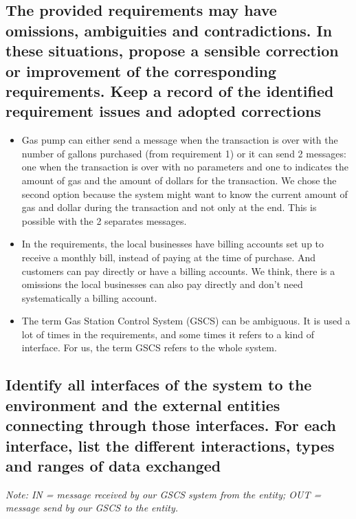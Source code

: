 \documentclass[11pt,a4paper]{article}
\begin{document}
\subsection*{The provided requirements may have omissions, ambiguities and contradictions. In these situations, propose a sensible correction or improvement of the corresponding requirements. Keep a record of the identified requirement issues and adopted corrections}
\begin{itemize}
	\item Gas pump can either send a message when the transaction is over with the number of gallons purchased (from requirement 1) or it can send 2 messages: one when the transaction is over with no parameters and one to indicates the amount of gas and the amount of dollars for the transaction.
We chose the second option because the system might want to know the current amount of gas and dollar during the transaction and not only at the end. This is possible with the 2 separates messages.
	\item In the requirements, the local businesses have billing accounts set up to receive a monthly bill, instead of paying at the time of purchase. And customers can pay directly or have a billing accounts. 
We think, there is a omissions the local businesses can also pay directly and don't need systematically a billing account.
	\item The term Gas Station Control System (GSCS) can be ambiguous. It is used a lot of times in the requirements, and some times it refers to a kind of interface. For us, the term GSCS refers to the whole system.
\end{itemize}


\subsection*{Identify all interfaces of the system to the environment and the external entities connecting through those interfaces. For each interface, list the different interactions, types and ranges of data exchanged}

\emph{Note: IN = message received by our GSCS system from the entity; OUT = message send by our GSCS to the entity.}
\end{document}
